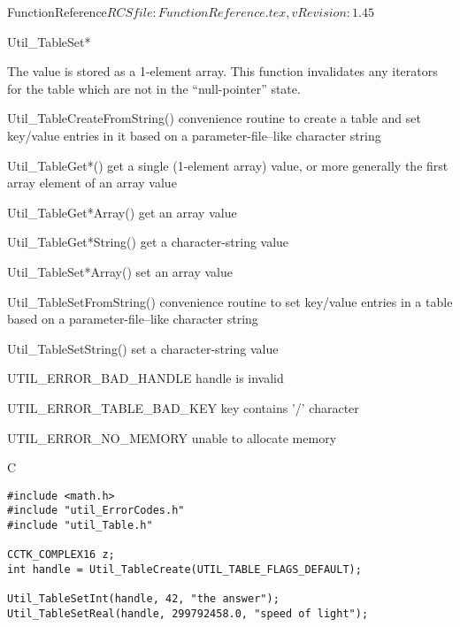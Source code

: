 \begin{cactuspart}{5}{FunctionReference}{$RCSfile: FunctionReference.tex,v $}{$Revision: 1.45 $}
\begin{FunctionDescription}{Util\_TableSet*}
\begin{Discussion}
The value is stored as a 1-element array.
\NewPar
This function invalidates any iterators for the table which are
not in the ``null-pointer'' state.
\end{Discussion}

\begin{SeeAlso}{Util\_TableCreateFromString()}
convenience routine to create a table and set key/value entries
in it based on a parameter-file--like character string
\end{SeeAlso}
\begin{SeeAlso}{Util\_TableGet*()}
get a single (1-element array) value,
or more generally the first array element of an array value
\end{SeeAlso}
\begin{SeeAlso}{Util\_TableGet*Array()}
get an array value
\end{SeeAlso}
\begin{SeeAlso}{Util\_TableGet*String()}
get a character-string value
\end{SeeAlso}
\begin{SeeAlso}{Util\_TableSet*Array()}
set an array value
\end{SeeAlso}
\begin{SeeAlso}{Util\_TableSetFromString()}
convenience routine to set key/value entries in a table based on a
parameter-file--like character string
\end{SeeAlso}
\begin{SeeAlso}{Util\_TableSetString()}
set a character-string value
\end{SeeAlso}

\begin{Error}{UTIL\_ERROR\_BAD\_HANDLE}
handle is invalid
\end{Error}
\begin{Error}{UTIL\_ERROR\_TABLE\_BAD\_KEY}
key contains '/' character
\end{Error}
\begin{Error}{UTIL\_ERROR\_NO\_MEMORY}
unable to allocate memory
\end{Error}

\begin{Example}{C}
\begin{verbatim}
#include <math.h>
#include "util_ErrorCodes.h"
#include "util_Table.h"

CCTK_COMPLEX16 z;
int handle = Util_TableCreate(UTIL_TABLE_FLAGS_DEFAULT);

Util_TableSetInt(handle, 42, "the answer");
Util_TableSetReal(handle, 299792458.0, "speed of light");


\end{verbatim}
\end{Example}
\end{FunctionDescription}
\end{cactuspart}
